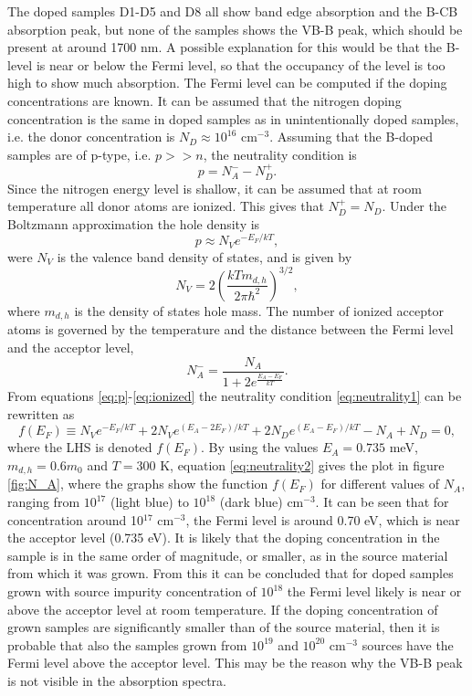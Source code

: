 The doped samples D1-D5 and D8 all show band edge absorption and the B-CB absorption peak, but none of the samples shows the VB-B peak, which should be present at around 1700 nm. A possible explanation for this would be that the B-level is near or below the Fermi level, so that the occupancy of the level is too high to show much absorption. The Fermi level can be computed if the doping concentrations are known. It can be assumed that the nitrogen doping concentration is the same in doped samples as in unintentionally doped samples, i.e. the donor concentration is $N_D \approx 10^{16}$ cm$^{-3}$. Assuming that the B-doped samples are of p-type, i.e. $p>>n$, the neutrality condition is
\begin{equation}
\label{eq:neutrality1}
p = N_A^- - N_D^+.
\end{equation}
Since the nitrogen energy level is shallow, it can be assumed that at room temperature all donor atoms are ionized. This gives that $N_D^+ =N_D$. Under the Boltzmann approximation the hole density is
\begin{equation}
\label{eq:p}
p \approx N_Ve^{-E_F/kT},
\end{equation}
were $N_V$ is the valence band density of states, and is given by
\begin{equation}
\label{eq:nv}
N_V = 2\left(\frac{kTm_{d,h}}{2\pi \hbar^2}\right)^{3/2},
\end{equation}
where $m_{d,h}$ is the density of states hole mass. The number of ionized acceptor atoms is governed by the temperature and the distance between the Fermi level and the acceptor level, 
\begin{equation}
\label{eq:ionized}
N_A^- = \frac{N_A}{1+2e^{\frac{E_A-E_F}{kT}}}.
\end{equation}
From equations \ref{eq:p}-\ref{eq:ionized} the neutrality condition \ref{eq:neutrality1} can be rewritten as
\begin{equation}
\label{eq:neutrality2}
f(E_F) \equiv N_Ve^{-E_F/kT}+2N_Ve^{(E_A-2E_F)/kT}+2N_De^{(E_A-E_F)/kT} - N_A + N_D = 0,
\end{equation}
where the LHS is denoted $f(E_F)$. By using the values $E_A = 0.735$ meV, $m_{d,h} = 0.6m_0$ and $T = 300$ K, equation \ref{eq:neutrality2} gives the plot in figure \ref{fig:N_A}, where the graphs show the function $f(E_F)$ for different values of $N_A$, ranging from $10^{17}$ (light blue) to $10^{18}$ (dark blue) cm$^{-3}$. It can be seen that for concentration around 10$^{17}$ cm$^{-3}$, the Fermi level is around 0.70 eV, which is near the acceptor level (0.735 eV). It is likely that the doping concentration in the sample is in the same order of magnitude, or smaller, as in the source material from which it was grown. From this it can be concluded that for doped samples grown with source impurity concentration of $10^{18}$ the Fermi level likely is near or above the acceptor level at room temperature. If the doping concentration of grown samples are significantly smaller than of the source material, then it is probable that also the samples grown from $10^{19}$ and $10^{20}$ cm$^{-3}$ sources have the Fermi level above the acceptor level. This may be the reason why the VB-B peak is not visible in the absorption spectra. 


